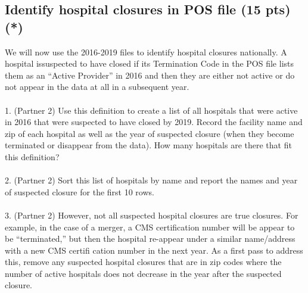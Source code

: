\documentclass[
  letterpaper,
  DIV=11,
  numbers=noendperiod]{scrartcl}
\makeatletter
\let\oldparagraph\paragraph
\renewcommand{\paragraph}{
    \@ifstar
      \xxxParagraphStar
      \xxxParagraphNoStar
  }
\newcommand{\xxxParagraphStar}[1]{\oldparagraph*{#1}\mbox{}}
\newcommand{\xxxParagraphNoStar}[1]{\oldparagraph{#1}\mbox{}}
\makeatother
\begin{document}
\subsection{Identify hospital closures in POS file (15 pts)
(*)}\label{identify-hospital-closures-in-pos-file-15-pts}

We will now use the 2016-2019 files to identify hospital closures
nationally. A hospital issuspected to have closed if its Termination
Code in the POS file lists them as an ``Active Provider'' in 2016 and
then they are either not active or do not appear in the data at all in a
subsequent year.

\paragraph{1. (Partner 2) Use this definition to create a list of all
hospitals that were active in 2016 that were suspected to have closed by
2019. Record the facility name and zip of each hospital as well as the
year of suspected closure (when they become terminated or disappear from
the data). How many hospitals are there that fit this
definition?}\label{partner-2-use-this-definition-to-create-a-list-of-all-hospitals-that-were-active-in-2016-that-were-suspected-to-have-closed-by-2019.-record-the-facility-name-and-zip-of-each-hospital-as-well-as-the-year-of-suspected-closure-when-they-become-terminated-or-disappear-from-the-data.-how-many-hospitals-are-there-that-fit-this-definition}

\paragraph{2. (Partner 2) Sort this list of hospitals by name and report
the names and year of suspected closure for the first 10
rows.}\label{partner-2-sort-this-list-of-hospitals-by-name-and-report-the-names-and-year-of-suspected-closure-for-the-first-10-rows.}

\paragraph{3. (Partner 2) However, not all suspected hospital closures
are true closures. For example, in the case of a merger, a CMS
certification number will be appear to be ``terminated,'' but then the
hospital re-appear under a similar name/address with a new CMS certifi
cation number in the next year. As a first pass to address this, remove
any suspected hospital closures that are in zip codes where the number
of active hospitals does not decrease in the year after the suspected
closure.}\label{partner-2-however-not-all-suspected-hospital-closures-are-true-closures.-for-example-in-the-case-of-a-merger-a-cms-certification-number-will-be-appear-to-be-terminated-but-then-the-hospital-re-appear-under-a-similar-nameaddress-with-a-new-cms-certifi-cation-number-in-the-next-year.-as-a-first-pass-to-address-this-remove-any-suspected-hospital-closures-that-are-in-zip-codes-where-the-number-of-active-hospitals-does-not-decrease-in-the-year-after-the-suspected-closure.}
\end{document}
